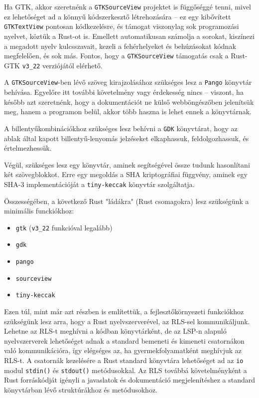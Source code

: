 Ha GTK, akkor szeretnénk a \texttt{GTKSourceView} projektet is függőséggé tenni, 
mivel ez lehetőséget ad a könnyű kódszerkesztő létrehozására -- ez egy kibővített \texttt{GTKTextView} pontosan kódkezelésre,
és támogat viszonylag sok programozási nyelvet, köztük a Rust-ot is.
Emellett automatikusan számolja a sorokat, kiszínezi a megadott nyelv kulcsszavait, 
kezeli a fehérhelyeket és behúzásokat kódnak megfelelően, és sok más.
Fontos, hogy a \texttt{GTKSourceView} támogatás csak a Rust-GTK \texttt{v3\_22} verziójától elérhető.

A \texttt{GTKSourceView}-ben lévő szöveg kirajzolásához szükséges lesz a \texttt{Pango} könyvtár behívása.
Egyelőre itt további követelmény vagy érdekesség nincs -- viszont, ha később azt szeretnénk, 
hogy a dokumentációt ne külső webböngészőben jelenítsük meg, hanem a programon belül, akkor több haszna is lehet ennek a könyvtárnak.

A billentyűkombinációkhoz szükséges lesz behívni a \texttt{GDK} könyvtárat, hogy az ablak által kapott
billentyű-lenyomás jelzéseket elkaphassuk, feldolgozhassuk, és értelmezhessük.

Végül, szükséges lesz egy könyvtár, aminek segítségével össze tudunk hasonlítani két szövegblokkot.
Erre egy megoldás a SHA kriptográfiai függvény, aminek egy SHA-3 implementációját a \texttt{tiny-keccak} könyvtár szolgáltatja.

Összességében, a következő Rust "ládákra" (Rust csomagokra) lesz szükségünk a minimális funckiókhoz:

\begin{itemize}
	\item \texttt{gtk} (\texttt{v3\_22} funkcióval legalább)
	\item \texttt{gdk}
	\item \texttt{pango}
	\item \texttt{sourceview}
	\item \texttt{tiny-keccak}
\end{itemize}

Ezen túl, mint már azt  részben is említettük, a fejlesztőkörnyezeti funkciókhoz szükségünk lesz arra,
hogy a Rust nyelvszerverével, az RLS-sel kommunikáljunk.
Lehetne az RLS-t meghívni a kódban könyvtárként, de az LSP-n\cite{lsp} alapuló nyelvszerverek lehetőséget
adnak a standard bemeneti és kimeneti csatornákon való kommunikációra, 
így elégséges az, ha gyermekfolyamatként meghívjuk az RLS-t.
A csatornák kezelésére a Rust standard könyvtára lehetőséget ad az \texttt{io} modul \texttt{stdin()}
és \texttt{stdout()} metódusokkal.
Az RLS továbbá követelményként a Rust forráskódját igényli a javaslatok és dokumentáció megjelenítéshez
a standard könyvtárban lévő struktúrákhoz és metódusokhoz.

